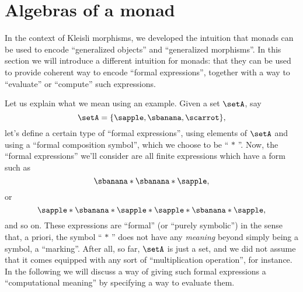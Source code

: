 

\section{Algebras of a monad}
\label{sec:Eilenberg-Moore}




In the context of Kleisli morphisms, we developed the intuition that monads can be used to encode ``generalized objects'' and ``generalized morphisms''.
In this section we will introduce a different intuition for monads: that they can be used to provide coherent way to encode ``formal expressions'', together with a way to ``evaluate'' or ``compute'' such expressions.

Let us explain what we mean using an example.
Given a set $\setA$, say
\begin{equation}
    \setA = \{ \sapple, \sbanana, \scarrot \},
\end{equation}
let's define a certain type of ``formal expressions'', using elements of $\setA$ and using a ``formal composition symbol'', which we choose to be `` $*$ ''.
Now, the ``formal expressions'' we'll consider are all finite expressions which have a form such as
\begin{equation}
    \label{eq:formal-composition-1}
    \sbanana * \sbanana * \sapple,
\end{equation}
or
\begin{equation}
    \label{eq:formal-composition-2}
    \sapple * \sbanana * \sapple * \sapple * \sbanana * \sapple,
\end{equation}
and so on.
These expressions are ``formal'' (or ``purely symbolic'') in the sense that, a priori, the symbol `` $*$ '' does not have any \emph{meaning} beyond simply being a symbol, a ``marking''.
After all, so far, $\setA$ is just a set, and we did not assume that it comes equipped with any sort of ``multiplication operation'', for instance.
In the following we will discuss a way of giving such formal expressions a ``computational meaning'' by specifying a way to evaluate them.


